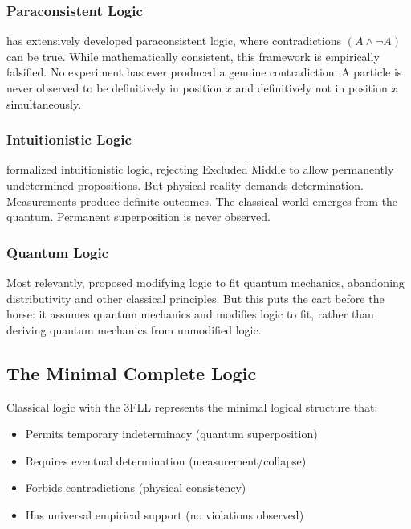 \documentclass[12pt,a4paper]{article}
\begin{document}
\subsubsection{Paraconsistent Logic}

\citet{priest2006doubt} has extensively developed paraconsistent logic, where contradictions $(A \land \neg A)$ can be true. While mathematically consistent, this framework is empirically falsified. No experiment has ever produced a genuine contradiction. A particle is never observed to be definitively in position $x$ and definitively not in position $x$ simultaneously.

\subsubsection{Intuitionistic Logic}

\citet{heyting1971intuitionism} formalized intuitionistic logic, rejecting Excluded Middle to allow permanently undetermined propositions. But physical reality demands determination. Measurements produce definite outcomes. The classical world emerges from the quantum. Permanent superposition is never observed.

\subsubsection{Quantum Logic}

Most relevantly, \citet{birkhoff1936logic} proposed modifying logic to fit quantum mechanics, abandoning distributivity and other classical principles. But this puts the cart before the horse: it assumes quantum mechanics and modifies logic to fit, rather than deriving quantum mechanics from unmodified logic.

\subsection{The Minimal Complete Logic}

Classical logic with the 3FLL represents the minimal logical structure that:
\begin{itemize}
\item Permits temporary indeterminacy (quantum superposition)
\item Requires eventual determination (measurement/collapse)
\item Forbids contradictions (physical consistency)
\item Has universal empirical support (no violations observed)
\end{itemize}
\end{document}
